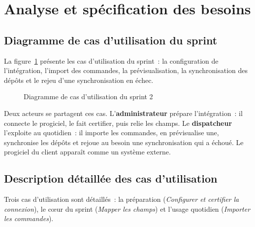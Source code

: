 \section{Analyse et spécification des besoins}

\subsection{Diagramme de cas d'utilisation du sprint}

La figure~\ref{fig:uc-s2} présente les cas d'utilisation du sprint~: la configuration de
l'intégration, l'import des commandes, la prévisualisation, la synchronisation des dépôts et le rejeu
d'une synchronisation en échec.

\begin{figure}[H]
\centering
{}
\caption{Diagramme de cas d'utilisation du sprint 2}
\label{fig:uc-s2}
\end{figure}

Deux acteurs se partagent ces cas. L'\textbf{administrateur} prépare l'intégration~: il connecte le
progiciel, le fait certifier, puis relie les champs. Le \textbf{dispatcheur} l'exploite au
quotidien~: il importe les commandes, en prévisualise une, synchronise les dépôts et rejoue au besoin
une synchronisation qui a échoué. Le progiciel du client apparaît comme un système externe.

\subsection{Description détaillée des cas d'utilisation}

Trois cas d'utilisation sont détaillés~: la préparation (\emph{Configurer et certifier la connexion}),
le c\oe ur du sprint (\emph{Mapper les champs}) et l'usage quotidien (\emph{Importer les commandes}).

